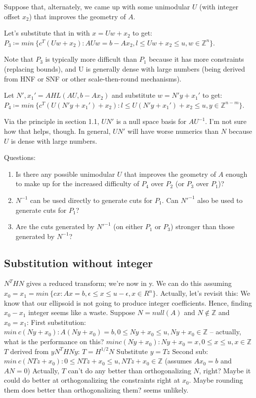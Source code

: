 \documentclass[11pt]{article}
\theoremstyle{definition}
\theoremstyle{remark}
\begin{document}
Suppose that, alternately, we came up with some unimodular $U$ (with integer offset $x_2$) that improves the geometry of $A$.

Let's substitute that in with $x = Uw + x_2$ to get:\\
$P_3 \coloneqq min~\{ c^T (Uw + x_2) : AUw=b-Ax_2, l \leq Uw + x_2 \leq u, w \in \mathbb{Z}^n \}$.

Note that $P_3$ is typically more difficult than $P_1$ because it has more constraints (replacing bounds), and U is generally dense with large numbers (being derived from HNF or SNF or other scale-then-round mechanisms).

Let $N', x_1' = AHL(AU, b - Ax_2)$ and substitute $w = N'y + x_1'$ to get:\\
$P_4 \coloneqq min~\{ c^T (U(N'y + x_1') + x_2) : l \leq U(N'y + x_1') + x_2 \leq u, y \in \mathbb{Z}^{n-m} \}$.

Via the principle in section 1.1, $UN'$ is a null space basis for $AU^{-1}$. I'm not sure how that helps, though. In general, $UN'$ will have worse numerics than $N$ because $U$ is dense with large numbers.

Questions:
\begin{enumerate}
    \item Is there any possible unimodular $U$ that improves the geometry of $A$ enough to make up for the increased difficulty of $P_4$ over $P_2$ (or $P_3$ over $P_1$)?
    \item $N^{-1}$ can be used directly to generate cuts for $P_1$. Can $N'^{-1}$ also be used to generate cuts for $P_1$?
    \item Are the cuts generated by $N'^{-1}$ (on either $P_1$ or $P_3$) stronger than those generated by $N^{-1}$?
\end{enumerate}

\subsection{Substitution without integer}

$N^T H N$ gives a reduced transform; we're now in y. We can do this assuming $x_0 = x_1 = min~\{cx: Ax=b, \epsilon \leq x \leq u-\epsilon, x \in R^n\} $.
Actually, let's revisit this: We know that our ellipsoid is not going to produce integer coefficients. Hence, finding $x_0 - x_1$ integer seems like a waste.
Suppose $N = null(A)$ and $N \not \in \mathbb{Z}$ and $x_0 = x_1$:
First substitution: $min~c(Ny + x_0): A(Ny + x_0)=b, 0 \leq Ny + x_0 \leq u, Ny + x_0 \in \mathbb{Z}$ 
-- actually, what is the performance on this? $min c(Ny + x_0): Ny + x_0 = x, 0 \leq x \leq u, x \in \mathbb{Z}$
$T$ derived from $y N^T H N y$: $T = H^{1/2} N$
Substitute $y = Tz$
Second sub: $min~c(NTz + x_0): 0 \leq NTz + x_0 \leq u, NTz + x_0 \in \mathbb{Z}$ (assumes $Ax_0=b$ and $AN=0$)
Actually, $T$ can't do any better than orthogonalizing $N$, right? Maybe it could do better at orthogonalizing the constraints right at $x_0$. Maybe rounding them does better than orthogonalizing them? seems unlikely.
\end{document}

